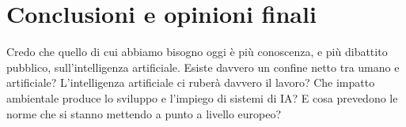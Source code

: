 \documentclass{article}
\begin{document}
\newpage \centering
\section{Conclusioni e opinioni finali}
\begin{justify}
   Credo che quello di cui abbiamo bisogno oggi è più conoscenza, e più dibattito pubblico, sull'intelligenza artificiale. Esiste davvero un confine netto tra umano e artificiale? L’intelligenza artificiale ci ruberà davvero il lavoro? Che impatto ambientale produce lo sviluppo e l'impiego di sistemi di IA? E cosa prevedono le norme che si stanno mettendo a punto a livello europeo?
\end{justify}
\begin{justify}
    
    
\end{justify}
\end{document}
